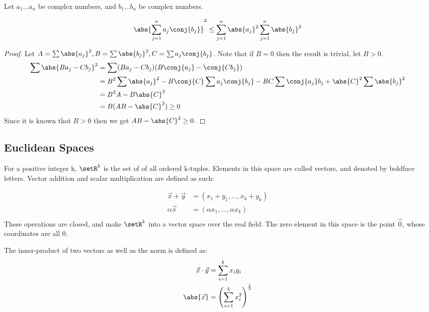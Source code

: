 \documentclass[12pt, letterpaper]{paper}
\begin{document}
\begin{theorem}
  \label{thr:1.35}
  Let $a_{1} ... a_{n}$ be complex numbers, and $b_{1} ... b_{n}$ be
  complex numbers.

\begin{align*}
  \abs{ \sum_{j=1}^n a_j \conj{b_j} }^2 \leq \sum_{j=1}^n \abs{a_j}^2 \sum_{j=1}^n \abs{b_j}^2
\end{align*}
\end{theorem}
\begin{proof}
  Let
  $A = \sum \abs{ a_j }^2, B = \sum \abs{ b_j }^2 , C = \sum a_j
  \conj{b_j}$. Note that if $B = 0$ then the result is trivial, let
  $B > 0$.
  \begin{align*}
    \sum \abs{ B a_j - C b_j }^2 &= \sum ( B a_j - C b_j )( B \conj{a_j} - \conj{C b_j} )\\
                                 &= B^2 \sum \abs{a_j}^2 - B \conj{C} \sum a_j \conj{b_j} - BC \sum \conj{a_j} b_j + \abs{C}^2 \sum \abs{b_j}^2 \\
                                 &= B^2 A - B \abs{C}^2 \\
                                 &= B( AB - \abs{C}^2 ) \geq 0\\
  \end{align*}
  Since it is known that $B > 0$ then we get $AB - \abs{C}^2 \geq 0$.
\end{proof}


\subsection{Euclidean Spaces}
\label{sec:orgd268d85}
For a positive integer k, $\setR^{k}$ is the set of of all ordered
k-tuples. Elements in this space are called vectors, and denoted by
boldface letters. Vector addition and scalar multiplication are
defined as such:

\begin{align*}
  \vec{x} + \vec{y} &= ( x_1 + y_1, ..., x_k + y_k )\\
  \alpha \vec{x} &= ( \alpha x_1, ..., \alpha x_k )\\
\end{align*}
These operations are closed, and make $\setR^{k}$ into a vector space
over the real field. The zero element in this space is the point
$\vec{0}$, whose coordinates are all $0$.

The inner-product of two vectors as well as the norm is defined as:
\begin{align*}
  \vec{x} \cdot \vec{y} &= \sum_{i=1}^k x_i y_i \\
  \abs{\vec{x}} &= \left( \sum_{i=1}^k x_i^2 \right )^{\frac{1}{2}} \\
\end{align*}
\end{document}
